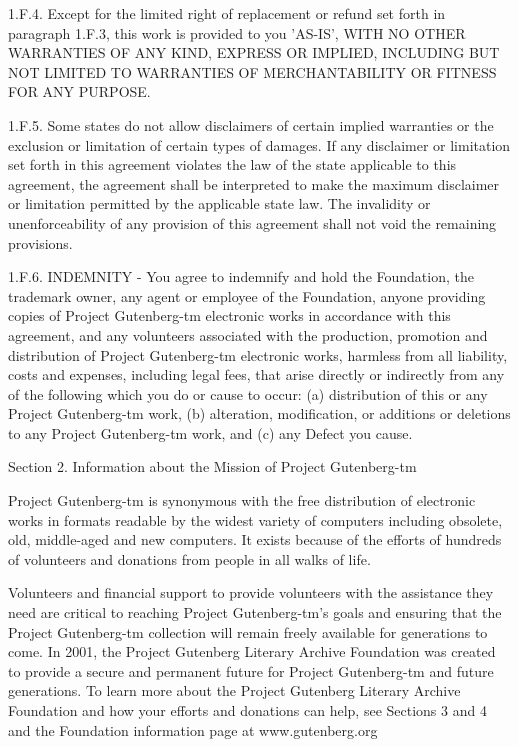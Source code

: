 1.F.4. Except for the limited right of replacement or refund set forth
in paragraph 1.F.3, this work is provided to you 'AS-IS', WITH NO
OTHER WARRANTIES OF ANY KIND, EXPRESS OR IMPLIED, INCLUDING BUT NOT
LIMITED TO WARRANTIES OF MERCHANTABILITY OR FITNESS FOR ANY PURPOSE.

1.F.5. Some states do not allow disclaimers of certain implied
warranties or the exclusion or limitation of certain types of
damages. If any disclaimer or limitation set forth in this agreement
violates the law of the state applicable to this agreement, the
agreement shall be interpreted to make the maximum disclaimer or
limitation permitted by the applicable state law. The invalidity or
unenforceability of any provision of this agreement shall not void the
remaining provisions.

1.F.6. INDEMNITY - You agree to indemnify and hold the Foundation, the
trademark owner, any agent or employee of the Foundation, anyone
providing copies of Project Gutenberg-tm electronic works in
accordance with this agreement, and any volunteers associated with the
production, promotion and distribution of Project Gutenberg-tm
electronic works, harmless from all liability, costs and expenses,
including legal fees, that arise directly or indirectly from any of
the following which you do or cause to occur: (a) distribution of this
or any Project Gutenberg-tm work, (b) alteration, modification, or
additions or deletions to any Project Gutenberg-tm work, and (c) any
Defect you cause.

Section 2. Information about the Mission of Project Gutenberg-tm

Project Gutenberg-tm is synonymous with the free distribution of
electronic works in formats readable by the widest variety of
computers including obsolete, old, middle-aged and new computers. It
exists because of the efforts of hundreds of volunteers and donations
from people in all walks of life.

Volunteers and financial support to provide volunteers with the
assistance they need are critical to reaching Project Gutenberg-tm's
goals and ensuring that the Project Gutenberg-tm collection will
remain freely available for generations to come. In 2001, the Project
Gutenberg Literary Archive Foundation was created to provide a secure
and permanent future for Project Gutenberg-tm and future
generations. To learn more about the Project Gutenberg Literary
Archive Foundation and how your efforts and donations can help, see
Sections 3 and 4 and the Foundation information page at
www.gutenberg.org

